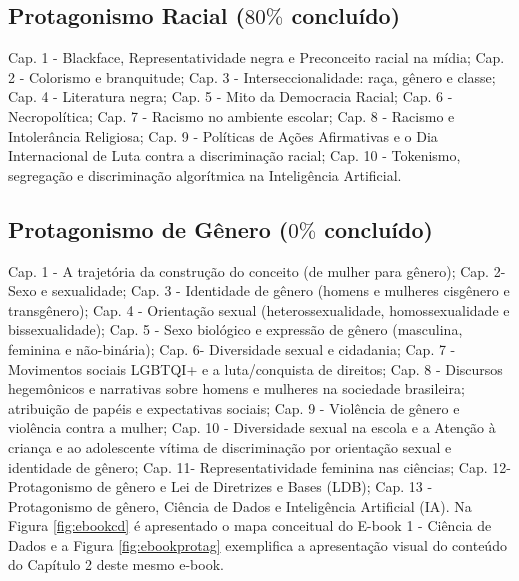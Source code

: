 \documentclass[
]{book}
\begin{document}
\hypertarget{protagonismo-racial-80-concluuxeddo}{%
\subsection{\texorpdfstring{Protagonismo Racial (\(80\%\) concluído)}{Protagonismo Racial (80\textbackslash\% concluído)}}\label{protagonismo-racial-80-concluuxeddo}}

Cap. 1 - Blackface, Representatividade negra e Preconceito racial na mídia; Cap. 2 - Colorismo e branquitude; Cap. 3 - Interseccionalidade: raça, gênero e classe; Cap. 4 - Literatura negra; Cap. 5 - Mito da Democracia Racial; Cap. 6 - Necropolítica; Cap. 7 - Racismo no ambiente escolar; Cap. 8 - Racismo e Intolerância Religiosa; Cap. 9 - Políticas de Ações Afirmativas e o Dia Internacional de Luta contra a discriminação racial; Cap. 10 - Tokenismo, segregação e discriminação algorítmica na Inteligência Artificial.

\hypertarget{protagonismo-de-guxeanero-0-concluuxeddo}{%
\subsection{\texorpdfstring{Protagonismo de Gênero (\(0\%\) concluído)}{Protagonismo de Gênero (0\textbackslash\% concluído)}}\label{protagonismo-de-guxeanero-0-concluuxeddo}}

Cap. 1 - A trajetória da construção do conceito (de mulher para gênero); Cap. 2- Sexo e sexualidade; Cap. 3 - Identidade de gênero (homens e mulheres cisgênero e transgênero); Cap. 4 - Orientação sexual (heterossexualidade, homossexualidade e bissexualidade); Cap. 5 - Sexo biológico e expressão de gênero (masculina, feminina e não-binária); Cap. 6- Diversidade sexual e cidadania; Cap. 7 - Movimentos sociais LGBTQI+ e a luta/conquista de direitos; Cap. 8 - Discursos hegemônicos e narrativas sobre homens e mulheres na sociedade brasileira; atribuição de papéis e expectativas sociais; Cap. 9 - Violência de gênero e violência contra a mulher; Cap. 10 - Diversidade sexual na escola e a Atenção à criança e ao adolescente vítima de discriminação por orientação sexual e identidade de gênero; Cap. 11- Representatividade feminina nas ciências; Cap. 12- Protagonismo de gênero e Lei de Diretrizes e Bases (LDB); Cap. 13 - Protagonismo de gênero, Ciência de Dados e Inteligência Artificial (IA).
Na Figura \ref{fig:ebookcd} é apresentado o mapa conceitual do E-book 1 - Ciência de Dados e a Figura \ref{fig:ebookprotag} exemplifica a apresentação visual do conteúdo do Capítulo 2 deste mesmo e-book.
\end{document}
